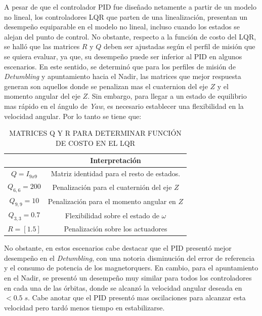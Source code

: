 A pesar de que el controlador PID fue diseñado netamente a partir de un modelo no lineal, los controladores LQR que parten de una linealización, presentan un desempeño equiparable en el modelo no lineal, incluso cuando los estados se alejan del punto de control. No obstante, respecto a la función de costo del LQR, se halló que las matrices $R$ y $Q$ deben ser ajustadas según el perfil de misión que se quiera evaluar, ya que, su desempeño puede ser inferior al PID en algunos escenarios. En este sentido, se determinó que para los perfiles de misión de \textit{Detumbling} y apuntamiento hacia el Nadir, las matrices que mejor respuesta generan son aquellos donde se penalizan mas el cuaternion del eje $Z$ y el momento angular del eje $Z$. Sin embargo, para llegar a un estado de equilibrio mas rápido en el ángulo de \textit{Yaw}, es necesario establecer una flexibilidad en la velocidad angular. Por lo tanto se tiene que:

\begin{table}[!ht]
	\caption{\MakeUppercase{Matrices Q y R para determinar función de costo en el LQR }}
	\begin{center}
		\begin{tabular}{ c c }			
			&  \textbf{Interpretación} \\ \hline			
			$Q = I_{9x9}$& Matriz identidad para el resto de estados. \\
			$Q_{6,6} = 200$& Penalización para el cuaternión del eje $Z$ \\
			$Q_{9,9} = 10$& Penalización para el momento angular en $Z$\\
			$Q_{3,3} = 0.7$& Flexibilidad sobre el estado de $\omega$\\
			$R=[1.5]$& Penalización sobre los actuadores\\ \hline			
		\end{tabular}
	\end{center}
	\label{table:gananciasLQR}
\end{table}
No obstante, en estos escenarios cabe destacar que el PID presentó mejor desempeño en el \textit{Detumbling}, con una notoria disminución del error de referencia y el consumo de potencia de los magnetorquers. En cambio, para el apuntamiento en el Nadir, se presentó un desempeño muy similar para todos los controladores en cada una de las órbitas, donde se alcanzó la velocidad angular deseada en $<0.5\;s$. Cabe anotar que el PID presentó mas oscilaciones para alcanzar esta velocidad pero tardó menos tiempo en estabilizarse.

